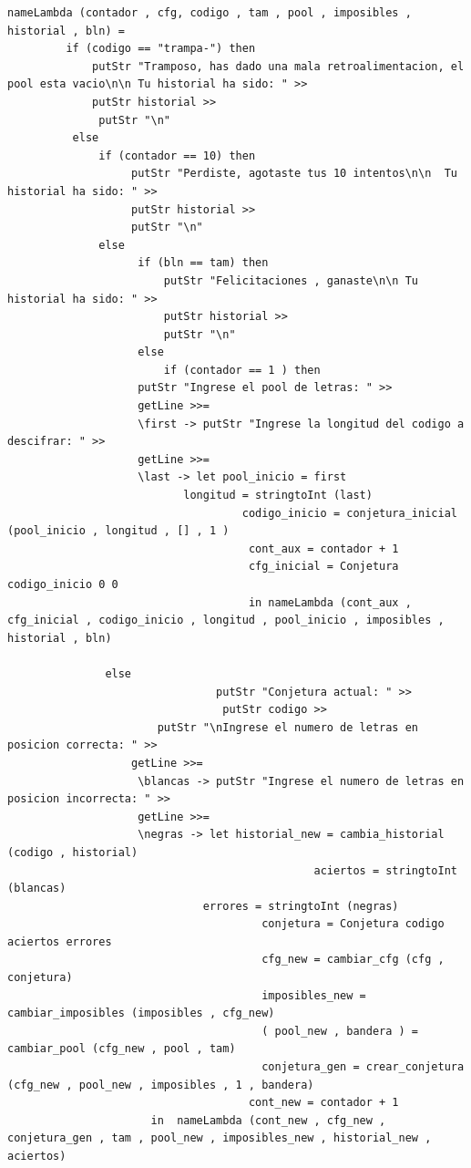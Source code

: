 \begin{itemize}
\begin{verbatim}
nameLambda (contador , cfg, codigo , tam , pool , imposibles , historial , bln) =
         if (codigo == "trampa-") then
             putStr "Tramposo, has dado una mala retroalimentacion, el pool esta vacio\n\n Tu historial ha sido: " >>
             putStr historial >>
              putStr "\n"
          else
              if (contador == 10) then
                   putStr "Perdiste, agotaste tus 10 intentos\n\n  Tu historial ha sido: " >>
                   putStr historial >>
                   putStr "\n"
              else
                    if (bln == tam) then
                        putStr "Felicitaciones , ganaste\n\n Tu historial ha sido: " >>
                        putStr historial >>
                        putStr "\n"
                    else
                        if (contador == 1 ) then
			        putStr "Ingrese el pool de letras: " >>
			        getLine >>=
			        \first -> putStr "Ingrese la longitud del codigo a descifrar: " >>
			        getLine >>=
			        \last -> let pool_inicio = first
				           longitud = stringtoInt (last)
		                            codigo_inicio = conjetura_inicial (pool_inicio , longitud , [] , 1 )
		                             cont_aux = contador + 1
		                             cfg_inicial = Conjetura codigo_inicio 0 0
		                             in nameLambda (cont_aux , cfg_inicial , codigo_inicio , longitud , pool_inicio , imposibles , historial , bln)
		                             
		       else
                                putStr "Conjetura actual: " >>
                                 putStr codigo >>
		               putStr "\nIngrese el numero de letras en posicion correcta: " >>
			       getLine >>=
			        \blancas -> putStr "Ingrese el numero de letras en posicion incorrecta: " >>
			        getLine >>=
			        \negras -> let historial_new = cambia_historial (codigo , historial)
                                               aciertos = stringtoInt (blancas)
				              errores = stringtoInt (negras)
		                               conjetura = Conjetura codigo aciertos errores
		                               cfg_new = cambiar_cfg (cfg , conjetura)
		                               imposibles_new = cambiar_imposibles (imposibles , cfg_new)
		                               ( pool_new , bandera ) = cambiar_pool (cfg_new , pool , tam)
		                               conjetura_gen = crear_conjetura (cfg_new , pool_new , imposibles , 1 , bandera)
		                             cont_new = contador + 1
				      in  nameLambda (cont_new , cfg_new , conjetura_gen , tam , pool_new , imposibles_new , historial_new , aciertos)



\end{verbatim}
\end{itemize}
